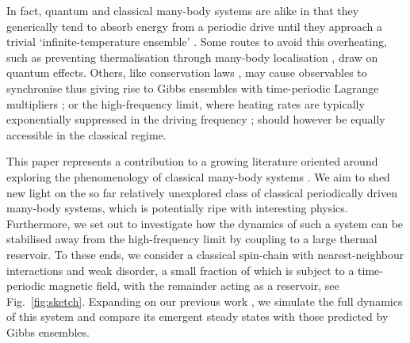 \documentclass[aps,pre,twocolumn,notitlepage,floats,10pt]{revtex4-1}
\begin{document}
In fact, quantum and classical many-body systems are alike in that they
generically tend to absorb energy from a periodic drive until they approach a
trivial `infinite-temperature ensemble'
\cite{Ponte-Chandran-Papic-Abanin,Lazarides-heating,Russomanno-Silva-Santoro,Ikeda-Polkovnikov}.
Some routes to avoid this overheating, such as preventing thermalisation through
many-body localisation \cite{Curt-phase}, draw on quantum effects.
Others, like conservation laws \cite{Haldar-Das}, may cause observables to
synchronise thus giving rise to Gibbs ensembles with time-periodic Lagrange
multipliers \cite{Lazarides-Das-Moessner-periodic}; 
or the high-frequency limit, where heating rates are typically exponentially
suppressed in the driving frequency
\cite{Abanin-DeRoeck-Ho-Huveneers,Abanin-DeRoeck-Ho-Huveneers2,Abanin-DeRoeck-Huveneers,Mori-Kuwahara-Saito,Mori-Kuwahara-Saito2};
should however be equally accessible in the classical regime.

This paper represents a contribution to a growing literature oriented around
exploring the phenomenology of classical many-body systems
\cite{Hodson-Jarzynski,Howell,Nunnenkamp,McRoberts-Bilitewski-Haque-Moessner}. 
We aim to shed new light on the
so far relatively unexplored class of classical periodically driven many-body
systems, which is potentially ripe with interesting physics.
Furthermore, we set out to investigate how the dynamics of such a system can be
stabilised away from the high-frequency limit by coupling to a large thermal
reservoir.
To these ends, we consider a classical spin-chain with nearest-neighbour
interactions and weak disorder, a small fraction of which is subject to a
time-periodic magnetic field, with the remainder acting as a reservoir, see
Fig.~\ref{fig:sketch}.
Expanding on our previous work \cite{short-paper}, we simulate the full
dynamics of this system and compare its emergent steady states with those
predicted by Gibbs ensembles.
\end{document}
